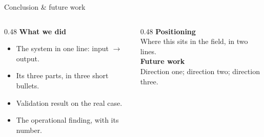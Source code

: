 \documentclass[aspectratio=169,11pt]{beamer}   %
\newcommand{\BgClosing}{}
\newcommand{\BgNone}{}   %
\begin{document}
\begin{frame}{Conclusion \& future work}
\begin{columns}[T]
\begin{column}{0.48\textwidth}
\small
\textcolor{accent}{\bfseries What we did}
\begin{itemize}\setlength\itemsep{0.9mm}
\item The system in one line: input $\to$ output.
\item Its three parts, in three short bullets.
\item Validation result on the real case.
\item The operational finding, with its number.
\end{itemize}
\end{column}
\begin{column}{0.48\textwidth}
\small
\textcolor{secondary}{\bfseries Positioning}\\[1mm]
\footnotesize Where this sits in the field, in two lines.\\[2.5mm]
\textcolor{accent}{\bfseries Future work}\\[1mm]
\footnotesize Direction one; direction two; direction three.
\end{column}
\end{columns}
\end{frame}

{\usebackgroundtemplate{\BgClosing}%
\begin{frame}[plain]
\end{frame}}
\end{document}
